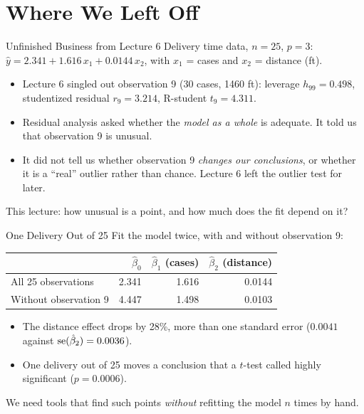\section{Where We Left Off}


\begin{frame}{Unfinished Business from Lecture 6}
    Delivery time data, $n=25$, $p=3$: $\hat y = 2.341 + 1.616\,x_1 + 0.0144\,x_2$, with $x_1$ = cases and $x_2$ = distance (ft).
    \svspace{0.5em}
    \begin{itemize}
        \item Lecture 6 singled out observation 9 (30 cases, 1460 ft): leverage $h_{99}=0.498$, studentized residual $r_9=3.214$, R-student $t_9=4.311$.
        \item Residual analysis asked whether the \emph{model as a whole} is adequate. It told us that observation 9 is unusual.
        \item It did not tell us whether observation 9 \emph{changes our conclusions}, or whether it is a ``real'' outlier rather than chance. Lecture 6 left the outlier test for later.
    \end{itemize}
    \svspace{0.5em}
    This lecture: how unusual is a point, and how much does the fit depend on it?
\end{frame}


\begin{frame}{One Delivery Out of 25}
    Fit the model twice, with and without observation 9:
    \begin{center}
        \small
        \begin{tabular}{lrrr}
            \toprule
            & $\hat\beta_0$ & $\hat\beta_1$ (cases) & $\hat\beta_2$ (distance) \\
            \midrule
            All 25 observations & 2.341 & 1.616 & 0.0144 \\
            Without observation 9 & 4.447 & 1.498 & 0.0103 \\
            \bottomrule
        \end{tabular}
    \end{center}
    \begin{itemize}
        \item The distance effect drops by 28\%, more than one standard error ($0.0041$ against $\operatorname{se}(\hat\beta_2)=0.0036$).
        \item One delivery out of 25 moves a conclusion that a $t$-test called highly significant ($p=0.0006$).
    \end{itemize}
    We need tools that find such points \emph{without} refitting the model $n$ times by hand.
\end{frame}


